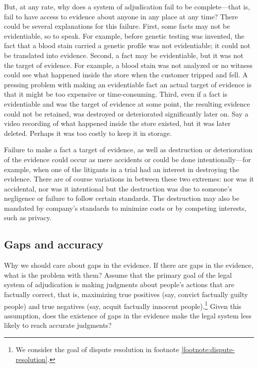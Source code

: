 \documentclass[
  10pt,
  dvipsnames,enabledeprecatedfontcommands]{scrartcl}
\begin{document}
But, at any rate, why does a system of adjudication fail to be
complete---that is, fail to have access to evidence about anyone in any
place at any time? There could be several explanations for this failure.
First, some facts may not be evidentiable, so to speak. For example,
before genetic testing was invented, the fact that a blood stain carried
a genetic profile was not evidentiable; it could not be translated into
evidence. Second, a fact may be evidentiable, but it was not the target
of evidence. For example, a blood stain was not analyzed or no witness
could see what happened inside the store when the customer tripped and
fell. A pressing problem with making an evidentiable fact an actual
target of evidence is that it might be too expensive or time-consuming.
Third, even if a fact is evidentiable and was the target of evidence at
some point, the resulting evidence could not be retained, was destroyed
or deteriorated significantly later on. Say a video recording of what
happened inside the store existed, but it was later deleted. Perhaps it
was too costly to keep it in storage.

Failure to make a fact a target of evidence, as well as destruction or
deterioration of the evidence could occur as mere accidents or could be
done intentionally---for example, when one of the litigants in a trial
had an interest in destroying the evidence. There are of course
variations in between these two extremes: nor was it accidental, nor was
it intentional but the destruction was due to someone's negligence or
failure to follow certain standards. The destruction may also be
mandated by company's standards to minimize costs or by competing
interests, such as privacy.

\hypertarget{gaps-and-accuracy}{%
\subsection{Gaps and accuracy}\label{gaps-and-accuracy}}

Why we should care about gaps in the evidence. If there are gaps in the
evidence, what is the problem with them? Assume that the primary goal of
the legal system of adjudication is making judgments about people's
actions that are factually correct, that is, maximizing true positives
(say, convict factually guilty people) and true negatives (say, acquit
factually innocent people).\footnote{We consider the goal of dispute
  resolution in footnote \ref{footnote:dispute-resolution}.} Given this
assumption, does the existence of gaps in the evidence make the legal
system less likely to reach accurate judgments?
\end{document}
